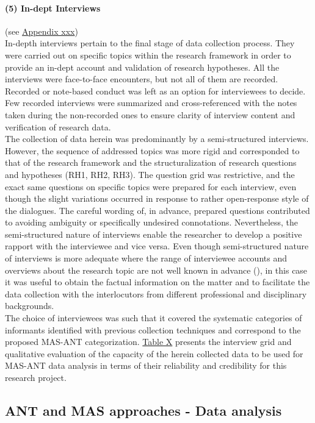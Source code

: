 \documentclass[11pt]{report}
\begin{document}
\paragraph{(5) In-dept Interviews}
(see \href{ref}{Appendix xxx})
\\
In-depth interviews pertain to the final stage of data collection process. They were carried out on specific topics within the research framework in order to provide an in-dept account and validation of research hypotheses. All the interviews were face-to-face encounters, but not all of them are recorded. Recorded or note-based conduct was left as an option for interviewees to decide. Few recorded interviews were summarized and cross-referenced with the notes taken during the non-recorded ones to ensure clarity of interview content and verification of research data.
\\
The collection of data herein was predominantly by a semi-structured interviews. However, the sequence of addressed topics was more rigid and corresponded to that of the research framework and the structuralization of research questions and hypotheses (RH1, RH2, RH3). The question grid was restrictive, and the exact same questions on specific topics were prepared for each interview, even though the slight variations occurred in response to rather open-response style of the dialogues. The careful wording of, in advance, prepared questions contributed to avoiding ambiguity or specifically undesired connotations. Nevertheless, the semi-structured nature of interviews enable the researcher to develop a positive rapport with the interviewee and vice versa. Even though semi-structured nature of interviews is more adequate where the range of interviewee accounts and overviews about the research topic are not well known in advance (\cite{King 1994}), in this case it was useful to obtain the factual  information on the matter and to facilitate the data collection with the interlocutors from different professional and disciplinary backgrounds. 
\\
The choice of interviewees was such that it covered the systematic categories of informants identified with previous collection techniques and correspond to the proposed MAS-ANT categorization. \href{ref}{Table X} presents the interview grid and qualitative evaluation of the capacity of the herein collected data to be used for MAS-ANT data analysis in terms of their reliability and credibility for this research project.

\subsection{ANT and MAS approaches - Data analysis}
\end{document}
